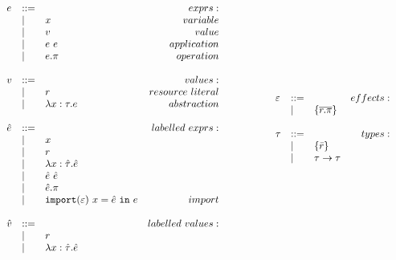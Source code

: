 \begin{figure}[h]
\vspace{-5pt}

\[
\begin{array}{lll}

\begin{array}{lllr}

e & ::= & ~ & exprs: \\
	& | & x & variable \\
	& | & v & value \\
	& | & e ~ e & application \\
	& | & e.\pi & operation \\
	&&\\

v & ::= & ~ & values: \\
	& | & r & resource~literal \\
	& | & \lambda x: \tau.e & abstraction \\
	&&\\
	
\hat e & ::= & ~ & labelled~exprs: \\
	& | & x \\
	& | & r \\
	& | & \lambda x: \hat \tau.\hat e \\
	& | & \hat e ~ \hat e \\
	& | & \hat e.\pi \\
	& | & \mathtt{import}(\varepsilon)~x = \hat e~\mathtt{in}~e & import \\
	&&\\

\hat v & ::= & ~ & labelled~values: \\
	& | & r \\
	& | & \lambda x: \hat \tau.\hat e \\
	&&\\

\end{array}

& ~~~~~~~~&

\begin{array}{lllr}

\varepsilon & ::= & ~ & effects: \\
	& | & \{ \overline{r.\pi} \} \\
	&&\\

\tau & ::= & ~ & types: \\
		& | & \{ \bar r \} \\
		& | & \tau \rightarrow \tau \\ 
		&&\\


\end{array}
\end{array}\]
\end{figure}
